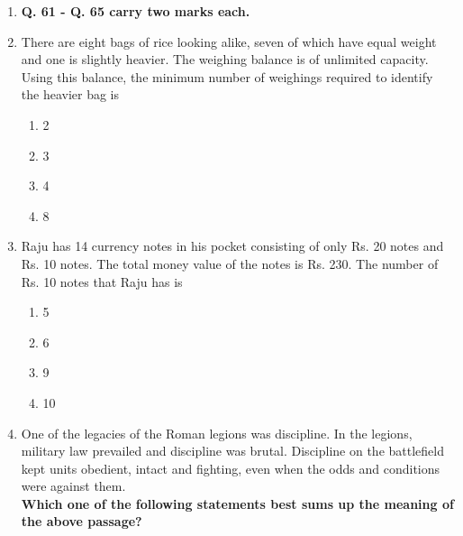 \documentclass[journal]{IEEEtran}
\begin{document}
\begin{enumerate}
{	}
	\item[]{
		\textbf{Q. 61 - Q. 65 carry two marks each.}
	}
    \item{
            There are eight bags of rice looking alike, seven of which have equal weight and one is slightly
            heavier. The weighing balance is of unlimited capacity. Using this balance, the minimum number
            of weighings required to identify the heavier bag is
             \hfill
                
            \begin{multicols}{4}
                \begin{enumerate}
                	\item 2
                	\item 3
                	\item 4
                	\item 8
                \end{enumerate}
            \end{multicols}

        
        }
    \item{
            Raju has 14 currency notes in his pocket consisting of only Rs. 20 notes and Rs. 10 notes. The total
            money value of the notes is Rs. 230. The number of Rs. 10 notes that Raju has is
                
            \begin{multicols}{4}
                \begin{enumerate}
                	\item 5
                	\item 6
                	\item 9
                	\item 10
                \end{enumerate}
            \end{multicols}
        
        }
    \item{
            One of the legacies of the Roman legions was discipline. In the legions, military law prevailed
            and discipline was brutal. Discipline on the battlefield kept units obedient, intact and fighting,
            even when the odds and conditions were against them.\\
            \textbf{Which one of the following statements best sums up the meaning of the above passage?}
             \hfill
            
}
\end{enumerate}
\end{document}

